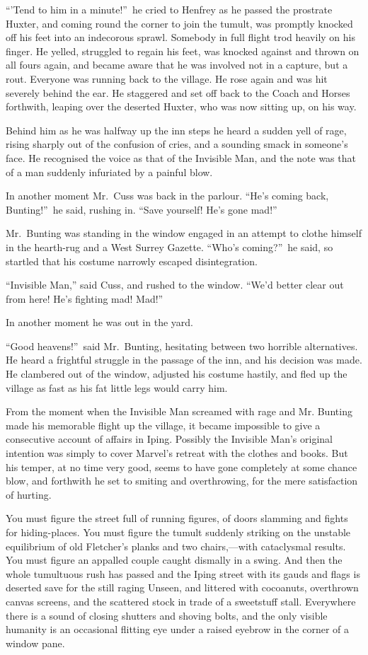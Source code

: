 “\kern1pt’Tend to him in a minute!”\ he cried to Henfrey as he passed the prostrate Huxter, and coming round the corner to join the tumult, was promptly knocked off his feet into an indecorous sprawl. Somebody in full flight trod heavily on his finger. He yelled, struggled to regain his feet, was knocked against and thrown on all fours again, and became aware that he was involved not in a capture, but a rout. Everyone was running back to the village. He rose again and was hit severely behind the ear. He staggered and set off back to the Coach and Horses forthwith, leaping over the deserted Huxter, who was now sitting up, on his way.

Behind him as he was halfway up the inn steps he heard a sudden yell of rage, rising sharply out of the confusion of cries, and a sounding smack in someone’s face. He recognised the voice as that of the Invisible Man, and the note was that of a man suddenly infuriated by a painful blow.

In another moment Mr.\ Cuss was back in the parlour. “He’s coming back, Bunting!”\ he said, rushing in. “Save yourself! He’s gone mad!”

Mr.\ Bunting was standing in the window engaged in an attempt to clothe himself in the hearth-rug and a West Surrey Gazette. “Who’s coming?”\ he said, so startled that his costume narrowly escaped disintegration.

“Invisible Man,” said Cuss, and rushed to the window. “We’d better clear out from here! He’s fighting mad! Mad!”

In another moment he was out in the yard.

“Good heavens!”\ said Mr.\ Bunting, hesitating between two horrible alternatives. He heard a frightful struggle in the passage of the inn, and his decision was made. He clambered out of the window, adjusted his costume hastily, and fled up the village as fast as his fat little legs would carry him.

From the moment when the Invisible Man screamed with rage and Mr. Bunting made his memorable flight up the village, it became impossible to give a consecutive account of affairs in Iping. Possibly the Invisible Man’s original intention was simply to cover Marvel’s retreat with the clothes and books. But his temper, at no time very good, seems to have gone completely at some chance blow, and forthwith he set to smiting and overthrowing, for the mere satisfaction of hurting.

You must figure the street full of running figures, of doors slamming and fights for hiding-places. You must figure the tumult suddenly striking on the unstable equilibrium of old Fletcher’s planks and two chairs,—with cataclysmal results. You must figure an appalled couple caught dismally in a swing. And then the whole tumultuous rush has passed and the Iping street with its gauds and flags is deserted save for the still raging Unseen, and littered with cocoanuts, overthrown canvas screens, and the scattered stock in trade of a sweetstuff stall. Everywhere there is a sound of closing shutters and shoving bolts, and the only visible humanity is an occasional flitting eye under a raised eyebrow in the corner of a window pane.

